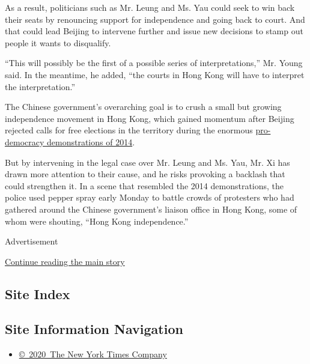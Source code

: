 As a result, politicians such as Mr. Leung and Ms. Yau could seek to win
back their seats by renouncing support for independence and going back
to court. And that could lead Beijing to intervene further and issue new
decisions to stamp out people it wants to disqualify.

``This will possibly be the first of a possible series of
interpretations,'' Mr. Young said. In the meantime, he added, ``the
courts in Hong Kong will have to interpret the interpretation.''

The Chinese government's overarching goal is to crush a small but
growing independence movement in Hong Kong, which gained momentum after
Beijing rejected calls for free elections in the territory during the
enormous
\href{http://www.nytimes3xbfgragh.onion/2014/12/15/world/asia/three-months-of-protests-end-quietly-in-hong-kong.html}{pro-democracy
demonstrations of 2014}.

But by intervening in the legal case over Mr. Leung and Ms. Yau, Mr. Xi
has drawn more attention to their cause, and he risks provoking a
backlash that could strengthen it. In a scene that resembled the 2014
demonstrations, the police used pepper spray early Monday to battle
crowds of protesters who had gathered around the Chinese government's
liaison office in Hong Kong, some of whom were shouting, ``Hong Kong
independence.''

Advertisement

\protect\hyperlink{after-bottom}{Continue reading the main story}

\hypertarget{site-index}{%
\subsection{Site Index}\label{site-index}}

\hypertarget{site-information-navigation}{%
\subsection{Site Information
Navigation}\label{site-information-navigation}}

\begin{itemize}
\tightlist
\item
  \href{https://help.nytimes3xbfgragh.onion/hc/en-us/articles/115014792127-Copyright-notice}{©~2020~The
  New York Times Company}
\end{itemize}

